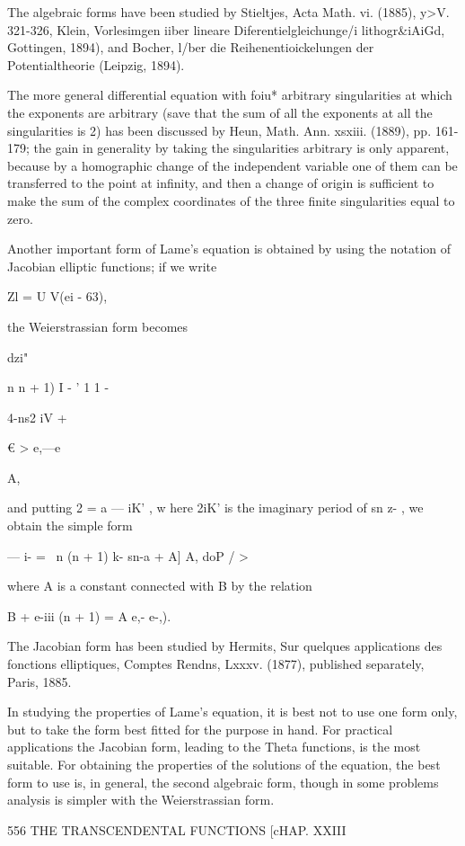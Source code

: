 {{{{The algebraic forms have been studied by Stieltjes, Acta Math. vi.
(1885), y>V. 321-326, Klein, Vorlesimgen iiber lineare
Diferentielgleichunge/i lithogr\&iAiGd, Gottingen, 1894), and Bocher,
l/ber die Reihenentioickelungen der Potentialtheorie (Leipzig, 1894).

The more general differential equation with foiu* arbitrary
singularities at which the exponents are arbitrary (save that the sum
of all the exponents at all the singularities is 2) has been discussed
by Heun, Math. Ann. xsxiii. (1889), pp. 161-179; the gain in
generality by taking the singularities arbitrary is only apparent,
because by a homographic change of the independent variable one of
them can be transferred to the point at infinity, and then a change of
origin is sufficient to make the sum of the complex coordinates of the
three finite singularities equal to zero.

Another important form of Lame's equation is obtained by using the
notation of Jacobian elliptic functions; if we write

Zl = U V(ei - 63),

the Weierstrassian form becomes

dzi"

n n + 1) I - ' 1 1 -

4-ns2 iV +

€ > e,—e

A,

and putting 2 = a — iK' , w here 2iK' is the imaginary period of sn z-
, we obtain the simple form

— i- = \ n (n + 1) k- sn-a + A] A, doP / >

where A is a constant connected with B by the relation

B + e-iii (n + 1) = A e,- e-,).

The Jacobian form has been studied by Hermits, Sur quelques
applications des fonctions elliptiques, Comptes Rendns, Lxxxv. (1877),
published separately, Paris, 1885.

In studying the properties of Lame's equation, it is best not to use
one form only, but to take the form best fitted for the purpose in
hand. For practical applications the Jacobian form, leading to the
Theta functions, is the most suitable. For obtaining the properties of
the solutions of the equation, the best form to use is, in general,
the second algebraic form, though in some problems analysis is simpler
with the Weierstrassian form.

556 THE TRANSCENDENTAL FUNCTIONS [cHAP. XXIII

}}}}
